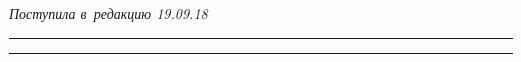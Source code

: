 \vspace*{-3pt}





\hfill{\small\textit{Поступила в~редакцию 19.09.18}}














\vspace*{8pt}





\hrule





\vspace*{2pt}















\hrule
















\def\tit{THE METHOD OF~DEPTH MAP CALCULATION\\ BASED ON~SOFT OPERATORS}





\def\titkol{The method of~depth map calculation based on~soft operators}








\def\aut{M.\,V.~Bobyr,  A.\,E.~Arkhipov, and~N.\,A.~Milostnaya}


\def\autkol{M.\,V.~Bobyr,  A.\,E.~Arkhipov, and~N.\,A.~Milostnaya}











